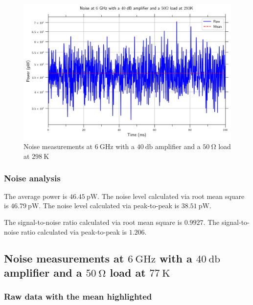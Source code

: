 \documentclass[english,12pt,a4paper]{article}
\begin{document}
\begin{figure}[H]
	\includegraphics[width=1\linewidth]{Plots/noise_floor_6_GHz_amplif_50ohm_rt}
	\caption{Noise measurements at $\qty{6}{\giga\hertz}$ with a $\qty{40}{\decibel}$ amplifier and a $\qty{50}{\ohm}$ load at $\qty{298}{\kelvin}$}
	\label{fig:noisefloor6ghzamplif50ohmrt}
\end{figure}


\hypertarget{noise-analysis}{%
	\subsubsection{Noise analysis}\label{noise-analysis_4}}



	The average power is $\qty{46.45}{\pico\watt}$.
	The noise level calculated via root mean square is $\qty{46.79}{\pico\watt}$.
	The noise level calculated via peak-to-peak is $\qty{38.51}{\pico\watt}$.
	
	The signal-to-noise ratio calculated via root mean square is $0.9927$.
	The signal-to-noise ratio calculated via peak-to-peak is $1.206$.
	
\subsection{Noise measurements at $\qty{6}{\giga\hertz}$ with a $\qty{40}{\decibel}$ amplifier and a $\qty{50}{\ohm}$ load at $\qty{77}{\kelvin}$}

\hypertarget{raw-data-with-the-mean-highlighted}{%
	\subsubsection{Raw data with the mean
		highlighted}\label{raw-data-with-the-mean-highlighted_7}}
\end{document}
